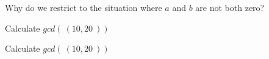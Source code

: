 
Why do we restrict to the situation where $a$ and $b$ are not both zero?

\vspace{50pt}


Calculate $gcd(~(10,20~))$

\vspace{50pt}

Calculate $gcd(~(10,20~))$

\vspace{50pt}